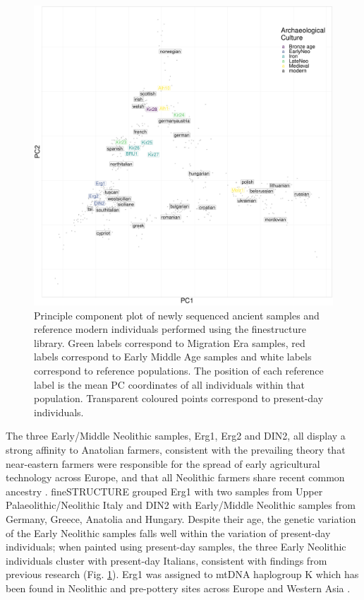 \begin{figure}[htp]
    \centering
    \includegraphics[width=1.0\textwidth]{../images/chapter4/chunklengths_moderns_ancients_PCA.pdf}
    \caption{Principle component plot of newly sequenced ancient samples and reference modern individuals performed using the finestructure library. Green labels correspond to Migration Era samples, red labels correspond to Early Middle Age samples and white labels correspond to reference populations. The position of each reference label is the mean PC coordinates of all individuals within that population. Transparent coloured points correspond to present-day individuals.}
    \label{fig:chunklengths_moderns_ancients_PCA_bav}
\end{figure}

The three Early/Middle Neolithic samples, Erg1, Erg2 and DIN2, all display a strong affinity to Anatolian farmers, consistent with the prevailing theory that near-eastern farmers were responsible for the spread of early agricultural technology across Europe, and that all Neolithic farmers share recent common ancestry \cite{Haak2010, haak2005ancient, bramanti2009genetic, Lazaridis2014}. fineSTRUCTURE  grouped Erg1 with two samples from Upper Palaeolithic/Neolithic Italy and DIN2 with Early/Middle Neolithic samples from Germany, Greece, Anatolia and Hungary. Despite their age, the genetic variation of the Early Neolithic samples falls well within the variation of present-day individuals; when painted using present-day samples, the three Early Neolithic individuals cluster with present-day Italians, consistent with findings from previous research \cite{Lazaridis2014, Haak2015} (Fig. \ref{fig:chunklengths_moderns_ancients_PCA_bav}). Erg1 was assigned to mtDNA haplogroup K which has been found in Neolithic and pre-pottery sites across Europe \cite{Hofmanova2016, fernandez2014ancient} and Western Asia \cite{Lazaridis2016, Mathieson2015}. 

